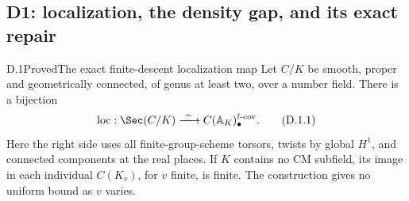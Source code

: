 \subsection{D1: localization, the density gap, and its exact repair}

\begin{statement}{D.1}{Proved}{The exact finite-descent localization map}
Let $C/K$ be smooth, proper and geometrically connected, of genus at
least two, over a number field. There is a bijection
\[
 \operatorname{loc}:\Sec(C/K)\xrightarrow{\ \sim\ }
 C(\mathbb A_K)_\bullet^{\mathrm{f\text{-}cov}}.
 \tag{D.1.1}
\]
Here the right side uses all finite-group-scheme torsors, twists by
global $H^1$, and connected components at the real places. If $K$
contains no CM subfield, its image in each individual $C(K_v)$,
for $v$ finite, is finite. The construction gives no uniform bound
as $v$ varies.
\end{statement}
